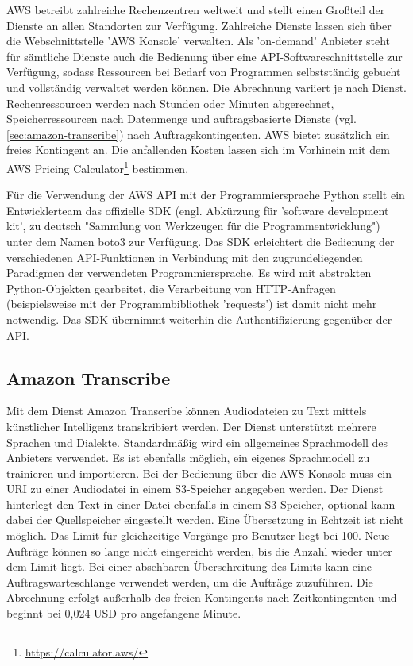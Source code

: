 AWS betreibt zahlreiche Rechenzentren weltweit und stellt einen Großteil der Dienste an allen Standorten zur Verfügung. Zahlreiche Dienste lassen sich über die Webschnittstelle 'AWS Konsole' verwalten. Als 'on-demand' Anbieter steht für sämtliche Dienste auch die Bedienung über eine API-Softwareschnittstelle zur Verfügung, sodass Ressourcen bei Bedarf von Programmen selbstständig gebucht und vollständig verwaltet werden können. Die Abrechnung variiert je nach Dienst. Rechenressourcen werden nach Stunden oder Minuten abgerechnet, Speicherressourcen nach Datenmenge und auftragsbasierte Dienste (vgl. \autoref{sec:amazon-transcribe}) nach Auftragskontingenten. AWS bietet zusätzlich ein freies Kontingent an. Die anfallenden Kosten lassen sich im Vorhinein mit dem AWS Pricing Calculator\footnote{\url{https://calculator.aws/}} bestimmen. 

Für die Verwendung der AWS API mit der Programmiersprache Python stellt ein Entwicklerteam das offizielle SDK (engl. Abkürzung für 'software development kit', zu deutsch "Sammlung von Werkzeugen für die Programmentwicklung") unter dem Namen boto3 zur Verfügung. Das SDK erleichtert die Bedienung der verschiedenen API-Funktionen in Verbindung mit den zugrundeliegenden Paradigmen der verwendeten Programmiersprache. Es wird mit abstrakten Python-Objekten gearbeitet, die Verarbeitung von HTTP-Anfragen (beispielsweise mit der Programmbibliothek 'requests') ist damit nicht mehr notwendig. Das SDK übernimmt weiterhin die Authentifizierung gegenüber der API.

\subsection{Amazon Transcribe}
\label{sec:amazon-transcribe}

Mit dem Dienst Amazon Transcribe können Audiodateien zu Text mittels künstlicher Intelligenz transkribiert werden. Der Dienst unterstützt mehrere Sprachen und Dialekte. Standardmäßig wird ein allgemeines Sprachmodell des Anbieters verwendet. Es ist ebenfalls möglich, ein eigenes Sprachmodell zu trainieren und importieren. Bei der Bedienung über die AWS Konsole muss ein URI zu einer Audiodatei in einem S3-Speicher angegeben werden. Der Dienst hinterlegt den Text in einer Datei ebenfalls in einem S3-Speicher, optional kann dabei der Quellspeicher eingestellt werden. Eine Übersetzung in Echtzeit ist nicht möglich. Das Limit für gleichzeitige Vorgänge pro Benutzer liegt bei 100. Neue Aufträge können so lange nicht eingereicht werden, bis die Anzahl wieder unter dem Limit liegt. Bei einer absehbaren Überschreitung des Limits kann eine Auftragswarteschlange verwendet werden, um die Aufträge zuzuführen. Die Abrechnung erfolgt außerhalb des freien Kontingents nach Zeitkontingenten und beginnt bei 0,024 USD pro angefangene Minute.

